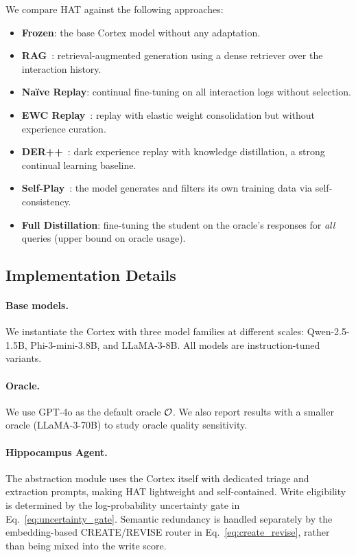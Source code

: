 We compare HAT against the following approaches:
\begin{itemize}[leftmargin=*,itemsep=2pt]
  \item \textbf{Frozen}: the base Cortex model without any adaptation.
  \item \textbf{RAG}~\citep{lewis2020retrieval}: retrieval-augmented generation using a dense retriever over the interaction history.
  \item \textbf{Na\"ive Replay}: continual fine-tuning on all interaction logs without selection.
  \item \textbf{EWC Replay}~\citep{kirkpatrick2017overcoming}: replay with elastic weight consolidation but without experience curation.
  \item \textbf{DER++}~\citep{buzzega2020dark}: dark experience replay with knowledge distillation, a strong continual learning baseline.
  \item \textbf{Self-Play}~\citep{chen2024self}: the model generates and filters its own training data via self-consistency.
  \item \textbf{Full Distillation}: fine-tuning the student on the oracle's responses for \emph{all} queries (upper bound on oracle usage).
\end{itemize}

\subsection{Implementation Details}
\label{sec:experiments:details}

\paragraph{Base models.}
We instantiate the Cortex with three model families at different scales: Qwen-2.5-1.5B, Phi-3-mini-3.8B, and LLaMA-3-8B.  All models are instruction-tuned variants.

\paragraph{Oracle.}
We use GPT-4o as the default oracle $\mathcal{O}$.  We also report results with a smaller oracle (LLaMA-3-70B) to study oracle quality sensitivity.

\paragraph{Hippocampus Agent.}
The abstraction module uses the Cortex itself with dedicated triage and extraction prompts, making HAT lightweight and self-contained.  Write eligibility is determined by the log-probability uncertainty gate in Eq.~\eqref{eq:uncertainty_gate}.  Semantic redundancy is handled separately by the embedding-based CREATE/REVISE router in Eq.~\eqref{eq:create_revise}, rather than being mixed into the write score.

